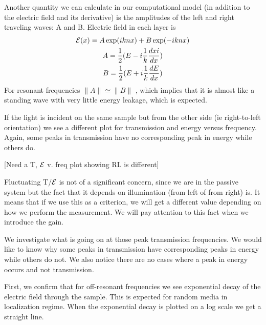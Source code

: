 Another quantity we can calculate in our computational model (in addition to the electric field and its derivative) is the amplitudes of the left and right traveling waves: A and B. Electric field in each layer is
\begin{equation}
\begin{gathered}
{\cal E}(x) = A \exp(i k n x) + B \exp(-i k n x) \\
A = \frac{1}{2} (E - i \frac{1}{k} \frac{dxi}{dx}) \\
B = \frac{1}{2} (E + i \frac{1}{k} \frac{dE}{dx})
\end{gathered}
\end{equation}
For resonant frequencies $ \| A \| \simeq \| B \| $ , which implies that it is almost like a standing wave with very little energy leakage, which is expected.


If the light is incident on the same sample but from the other side (ie right-to-left orientation) we see a different plot for transmission and energy versus frequency. Again, some peaks in transmission have no corresponding peak in energy while others do.

[Need a T, ${\cal E}$ v. freq plot showing RL is different]

Fluctuating T/${\cal E}$ is not of a significant concern, since we are in the passive system but the fact that it depends on illumination (from left of from right) is. %
It means that if we use this as a criterion, we will get a different value depending on how we perform the measurement. We will pay attention to this fact when we introduce the gain.

We investigate what is going on at those peak transmission frequencies. We would like to know why some peaks in transmission have corresponding peaks in energy while others do not. We also notice there are no cases where a peak in energy occurs and not transmission.

First, we confirm that for off-resonant frequencies we see exponential decay of the electric field through the sample. This is expected for random media in localization regime. When the exponential decay is plotted on a log scale we get a straight line.

